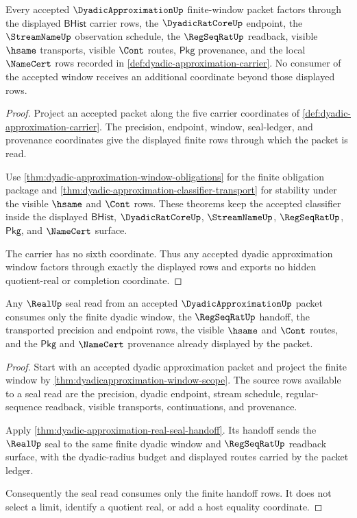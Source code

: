 \begin{theorem}\label{thm:dyadicapproximation-window-scope}
Every accepted $\DyadicApproximationUp$ finite-window packet factors through
the displayed $\mathsf{BHist}$ carrier rows, the $\DyadicRatCoreUp$ endpoint,
the $\StreamNameUp$ observation schedule, the $\RegSeqRatUp$ readback, visible
$\hsame$ transports, visible $\Cont$ routes, $\mathsf{Pkg}$ provenance, and
the local $\NameCert$ rows recorded in \autoref{def:dyadic-approximation-carrier}.
No consumer of the accepted window receives an additional coordinate beyond
those displayed rows.
\end{theorem}
\begin{proof}
Project an accepted packet along the five carrier coordinates of
\autoref{def:dyadic-approximation-carrier}. The precision, endpoint, window,
seal-ledger, and provenance coordinates give the displayed finite rows through
which the packet is read.

Use \autoref{thm:dyadic-approximation-window-obligations} for the finite
obligation package and \autoref{thm:dyadic-approximation-classifier-transport}
for stability under the visible $\hsame$ and $\Cont$ rows. These theorems
keep the accepted classifier inside the displayed $\mathsf{BHist}$,
$\DyadicRatCoreUp$, $\StreamNameUp$, $\RegSeqRatUp$, $\mathsf{Pkg}$, and
$\NameCert$ surface.

The carrier has no sixth coordinate. Thus any accepted dyadic approximation
window factors through exactly the displayed rows and exports no hidden
quotient-real or completion coordinate.
\end{proof}

\begin{theorem}\label{thm:dyadicapproximation-real-seal-scope}
Any $\RealUp$ seal read from an accepted $\DyadicApproximationUp$ packet
consumes only the finite dyadic window, the $\RegSeqRatUp$ handoff, the
transported precision and endpoint rows, the visible $\hsame$ and $\Cont$
routes, and the $\mathsf{Pkg}$ and $\NameCert$ provenance already displayed by
the packet.
\end{theorem}
\begin{proof}
Start with an accepted dyadic approximation packet and project the finite
window by \autoref{thm:dyadicapproximation-window-scope}. The source rows
available to a seal read are the precision, dyadic endpoint, stream schedule,
regular-sequence readback, visible transports, continuations, and provenance.

Apply \autoref{thm:dyadic-approximation-real-seal-handoff}. Its handoff sends
the $\RealUp$ seal to the same finite dyadic window and
$\RegSeqRatUp$ readback surface, with the dyadic-radius budget and displayed
routes carried by the packet ledger.

Consequently the seal read consumes only the finite handoff rows. It does not
select a limit, identify a quotient real, or add a host equality coordinate.
\end{proof}

